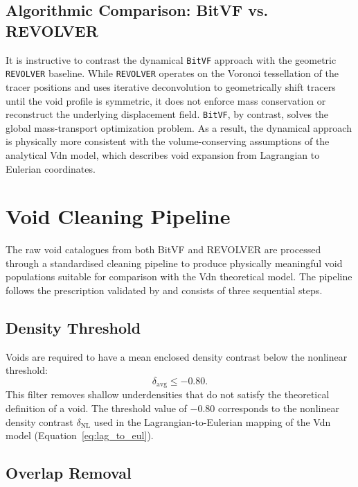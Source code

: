 \documentclass[12pt]{report}
\begin{document}
\subsection{Algorithmic Comparison: BitVF vs. REVOLVER}

It is instructive to contrast the dynamical \texttt{BitVF} approach with the geometric \texttt{REVOLVER} baseline. While \texttt{REVOLVER} operates on the Voronoi tessellation of the tracer positions and uses iterative deconvolution to geometrically shift tracers until the void profile is symmetric, it does not enforce mass conservation or reconstruct the underlying displacement field. \texttt{BitVF}, by contrast, solves the global mass-transport optimization problem. As a result, the dynamical approach is physically more consistent with the volume-conserving assumptions of the analytical Vdn model, which describes void expansion from Lagrangian to Eulerian coordinates.


\section{Void Cleaning Pipeline}
\label{sec:cleaning}

The raw void catalogues from both BitVF and REVOLVER are processed through a standardised cleaning pipeline to produce physically meaningful void populations suitable for comparison with the Vdn theoretical model. The pipeline follows the prescription validated by \citet{Sartori2025} and consists of three sequential steps.

\subsection{Density Threshold}

Voids are required to have a mean enclosed density contrast below the nonlinear threshold:
\begin{equation}
    \delta_\mathrm{avg} \leq -0.80
    \label{eq:density_threshold}.
\end{equation}
This filter removes shallow underdensities that do not satisfy the theoretical definition of a void. The threshold value of $-0.80$ corresponds to the nonlinear density contrast $\delta_\mathrm{NL}$ used in the Lagrangian-to-Eulerian mapping of the Vdn model (Equation~\ref{eq:lag_to_eul}).

\subsection{Overlap Removal}
\label{sec:overlap_criteria}
\end{document}
